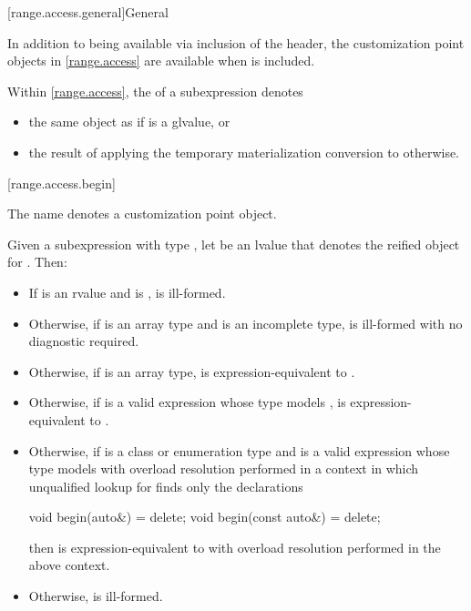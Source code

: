 [range.access.general]{General}

\pnum
In addition to being available via inclusion of the 
header, the customization point objects in \ref{range.access} are
available when  is included.

\pnum
Within \ref{range.access},
the  of a subexpression  denotes
\begin{itemize}
\item
the same object as  if  is a glvalue, or
\item
the result of applying
the temporary materialization conversion to  otherwise.
\end{itemize}

[range.access.begin]{}
%

\pnum
The name  denotes a customization point
object.

\pnum
Given a subexpression  with type ,
let  be an lvalue that denotes the reified object for .
Then:

\begin{itemize}
\item
  If  is an rvalue and
   is ,
   is ill-formed.

\item
  Otherwise, if  is an array type and
   is an incomplete type,
   is ill-formed with no diagnostic required.

\item
  Otherwise, if  is an array type,
   is expression-equivalent to .

\item
  Otherwise, if 
  is a valid expression whose type models
  ,
   is expression-equivalent to
  .

\item
  Otherwise, if  is a class or enumeration type and
  is a valid expression whose type models
  with overload resolution performed in a context in which
  unqualified lookup for  finds only the declarations
\begin{codeblock}
void begin(auto&) = delete;
void begin(const auto&) = delete;
\end{codeblock}
  then  is expression-equivalent to
  with overload resolution performed in the above context.

\item
  Otherwise,  is ill-formed.
\end{itemize}

